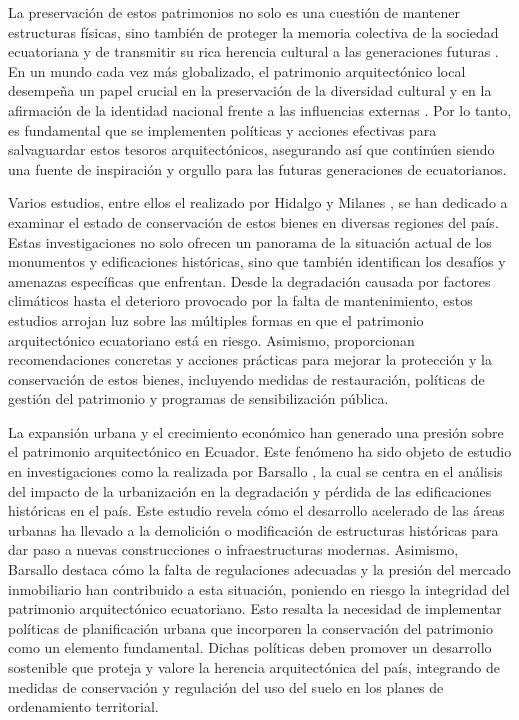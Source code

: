 \documentclass[journal,article,submit,pdftex,moreauthors]{Definitions/mdpi}
\begin{document}
La preservación de estos patrimonios no solo es una cuestión de mantener estructuras físicas, sino también de proteger la memoria colectiva de la sociedad ecuatoriana y de transmitir su rica herencia cultural a las generaciones futuras \cite{art:articulo11}. En un mundo cada vez más globalizado, el patrimonio arquitectónico local desempeña un papel crucial en la preservación de la diversidad cultural y en la afirmación de la identidad nacional frente a las influencias externas \cite{art:articulo12}. Por lo tanto, es fundamental que se implementen políticas y acciones efectivas para salvaguardar estos tesoros arquitectónicos, asegurando así que continúen siendo una fuente de inspiración y orgullo para las futuras generaciones de ecuatorianos.

Varios estudios, entre ellos el realizado por Hidalgo y Milanes \cite{art:articulo13}, se han dedicado a examinar el estado de conservación de estos bienes en diversas regiones del país. Estas investigaciones no solo ofrecen un panorama de la situación actual de los monumentos y edificaciones históricas, sino que también identifican los desafíos y amenazas específicas que enfrentan. Desde la degradación causada por factores climáticos hasta el deterioro provocado por la falta de mantenimiento, estos estudios arrojan luz sobre las múltiples formas en que el patrimonio arquitectónico ecuatoriano está en riesgo. Asimismo, proporcionan recomendaciones concretas y acciones prácticas para mejorar la protección y la conservación de estos bienes, incluyendo medidas de restauración, políticas de gestión del patrimonio y programas de sensibilización pública\cite{art:articulo14}.  

La expansión urbana y el crecimiento económico han generado una presión sobre el patrimonio arquitectónico en Ecuador. Este fenómeno ha sido objeto de estudio en investigaciones como la realizada por Barsallo \cite{art:articulo15}, la cual se centra en el análisis del impacto de la urbanización en la degradación y pérdida de las edificaciones históricas en el país. Este estudio revela cómo el desarrollo acelerado de las áreas urbanas ha llevado a la demolición o modificación de estructuras históricas para dar paso a nuevas construcciones o infraestructuras modernas. Asimismo, Barsallo destaca cómo la falta de regulaciones adecuadas y la presión del mercado inmobiliario han contribuido a esta situación, poniendo en riesgo la integridad del patrimonio arquitectónico ecuatoriano. Esto resalta la necesidad de implementar políticas de planificación urbana que incorporen la conservación del patrimonio como un elemento fundamental. Dichas políticas deben promover un desarrollo sostenible que proteja y valore la herencia arquitectónica del país, integrando de medidas de conservación y regulación del uso del suelo en los planes de ordenamiento territorial.
\end{document}
